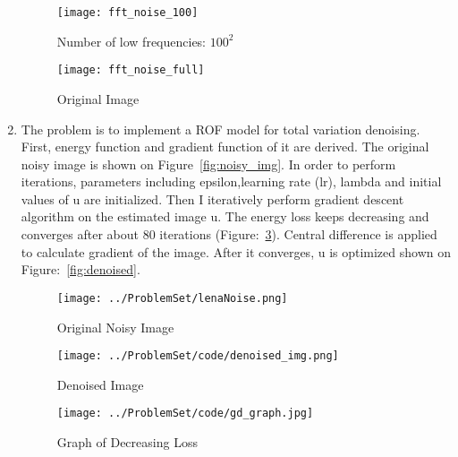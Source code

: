 \documentclass[11pt]{article}
\begin{document}
\begin{enumerate}
\begin{figure}[H]
	\begin{center}
		\texttt{[image: fft\_noise\_100]}
		\caption{Number of low frequencies: $100^2$}
		\label{fig:fft_100}
	\end{center}
\end{figure}

\begin{figure}[H]
	\begin{center}
		\texttt{[image: fft\_noise\_full]}
		\caption{Original Image}
		\label{fig:fft_full}
	\end{center}
\end{figure}
    

\item The problem is to implement a ROF model for total variation denoising. First, energy function and gradient function of it are derived. The original noisy image is shown on Figure~\ref{fig:noisy_img}. In order to perform iterations, parameters including epsilon,learning rate (lr), lambda and initial values of u are initialized. Then I iteratively perform gradient descent algorithm on the estimated image u. The energy loss keeps decreasing and converges after about 80 iterations (Figure:~\ref{fig:graph}). Central difference is applied to calculate gradient of the image. After it converges, u is optimized shown on Figure:~\ref{fig:denoised}.

\begin{figure}[h]
\begin{center}
\texttt{[image: ../ProblemSet/lenaNoise.png]}
\caption{Original Noisy Image}
\label{fig:noisy_img}
\end{center}
\begin{center}
	\texttt{[image: ../ProblemSet/code/denoised\_img.png]}
	\caption{Denoised Image}
	\label{fig:denoised}
\end{center}
\begin{center}
	\texttt{[image: ../ProblemSet/code/gd\_graph.jpg]}
	\caption{Graph of Decreasing Loss}
	\label{fig:graph}
\end{center}
\end{figure}


\end{enumerate}
\end{document}
